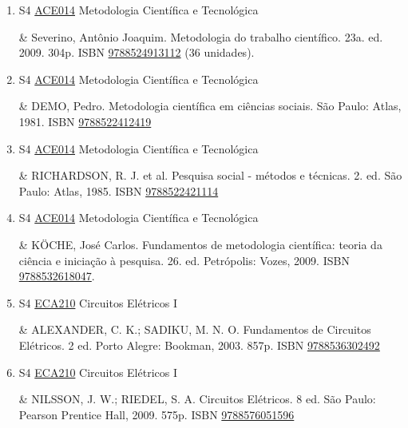 \documentclass[12pt,a4paper]{book}
\begin{document}
\begin{enumerate}
 \item S4 \hyperref[PUD:ACE014]{ACE014} Metodologia Científica e Tecnológica

& Severino, Antônio Joaquim.  Metodologia do trabalho científico.  23a.  ed.  2009.  304p.  ISBN \href{http://www.bn.br/site/pages/servicosProfissionais/agenciaISBN/isbnBusca/FbnBuscaISBNCatalogo.asp?pField=ISBN&pIntPagina=1&pISBN=24913112&nidbISBN=true&hidbISBN=true}{9788524913112} (36 unidades).
 \item S4 \hyperref[PUD:ACE014]{ACE014} Metodologia Científica e Tecnológica

&   DEMO, Pedro.  Metodologia científica em ciências sociais.  São Paulo: Atlas, 1981.  ISBN \href{http://www.bn.br/site/pages/servicosProfissionais/agenciaISBN/isbnBusca/FbnBuscaISBNCatalogo.asp?pField=ISBN&pIntPagina=1&pISBN=22412419&nidbISBN=true&hidbISBN=true}{9788522412419}
 

 \item S4 \hyperref[PUD:ACE014]{ACE014} Metodologia Científica e Tecnológica

&   RICHARDSON, R.  J.  et al.  Pesquisa social - métodos e técnicas.  2.  ed.  São Paulo: Atlas, 1985.  ISBN \href{http://www.bn.br/site/pages/servicosProfissionais/agenciaISBN/isbnBusca/FbnBuscaISBNCatalogo.asp?pField=ISBN&pIntPagina=1&pISBN=22421114&nidbISBN=true&hidbISBN=true}{9788522421114}
 

 \item S4 \hyperref[PUD:ACE014]{ACE014} Metodologia Científica e Tecnológica

&   KÖCHE, José Carlos.  Fundamentos de metodologia científica: teoria da ciência e iniciação à pesquisa.  26.  ed.  Petrópolis: Vozes, 2009.  ISBN \href{http://www.bn.br/site/pages/servicosProfissionais/agenciaISBN/isbnBusca/FbnBuscaISBNCatalogo.asp?pField=ISBN&pIntPagina=1&pISBN=32618047&nidbISBN=true&hidbISBN=true}{9788532618047}.
 \item S4 \hyperref[PUD:ECA210]{ECA210} Circuitos Elétricos I

& ALEXANDER, C.  K.;  SADIKU, M.  N.  O.  Fundamentos de Circuitos Elétricos.  2 ed. 
Porto Alegre: Bookman, 2003.  857p.  ISBN \href{http://www.bn.br/site/pages/servicosProfissionais/agenciaISBN/isbnBusca/FbnBuscaISBNCatalogo.asp?pField=ISBN&pIntPagina=1&pISBN=36302492&nidbISBN=true&hidbISBN=true}{9788536302492}
 

 \item S4 \hyperref[PUD:ECA210]{ECA210} Circuitos Elétricos I

&  NILSSON, J.  W.;  RIEDEL, S.  A.  Circuitos Elétricos.  8 ed.  São Paulo: Pearson 
Prentice Hall, 2009.  575p.  ISBN \href{http://www.bn.br/site/pages/servicosProfissionais/agenciaISBN/isbnBusca/FbnBuscaISBNCatalogo.asp?pField=ISBN&pIntPagina=1&pISBN=76051596&nidbISBN=true&hidbISBN=true}{9788576051596}
 


\end{enumerate}
\end{document}
